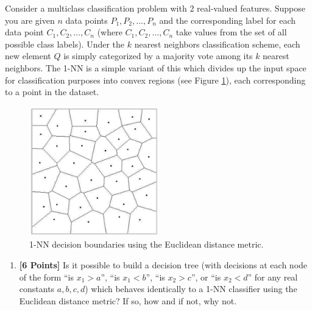 Consider a multiclass classification problem with 2 real-valued features. Suppose you are given $n$ data points $P_1, P_2, \ldots, P_n$ and the corresponding label for each data point $C_1, C_2, \ldots, C_n$ (where $C_1, C_2, \ldots, C_n$ take values from the set of all possible class labels). Under the $k$ nearest neighbors classification scheme, each new element $Q$ is simply categorized by a majority vote among its $k$ nearest neighbors. The 1-NN is a simple variant of this which divides up the input space for classification purposes into convex regions (see Figure \ref{fig:KNN_and_DT}), each corresponding to a point in the dataset.

\begin{figure}[H]
    \centering
    \includegraphics[width=0.5\textwidth]{images/1_KNN_and_DT.png}
    \caption{1-NN decision boundaries using the Euclidean distance metric.}
    \label{fig:KNN_and_DT}
\end{figure}
\begin{enumerate}

\item {\bf [6 Points]} Is it possible to build a decision tree (with decisions at each node of the form ``is $x_1 > a$'', ``is $x_1 < b$'', ``is $x_2 > c$'', or ``is $x_2 < d$'' for any real constants $a,b,c,d$) which behaves identically to a 1-NN classifier using the Euclidean distance metric? If so, how and if not, why not.

\begin{tcolorbox}[fit,height=7cm, width=15cm, blank, borderline={1pt}{-2pt}]

\end{tcolorbox}

\end{enumerate}
\newpage